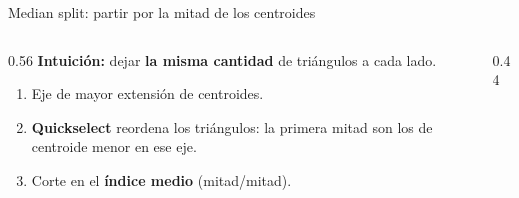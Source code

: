 \documentclass[aspectratio=169,11pt]{beamer}
\newcommand{\hl}[1]{{\color{primdk}\textbf{#1}}}
\begin{document}
\begin{frame}{Median split: partir por la mitad de los centroides}
\begin{columns}[c]
\begin{column}{0.56\textwidth}
\textbf{Intuici\'on:} dejar \hl{la misma cantidad} de tri\'angulos a cada lado.
\begin{enumerate}\itemsep2pt
  \item Eje de mayor extensi\'on de centroides.
  \item \hl{Quickselect} reordena los tri\'angulos: la primera mitad son los de
        centroide menor en ese eje.
  \item Corte en el \hl{\'indice medio} (mitad/mitad).
\end{enumerate}
\end{column}
\begin{column}{0.44\textwidth}\centering
{}
\end{column}
\end{columns}
\end{frame}
\end{document}
